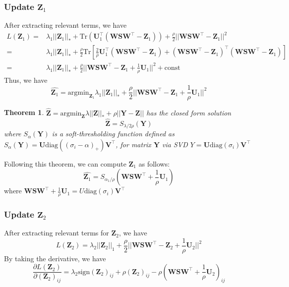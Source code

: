 \documentclass{article} %
\newtheorem{theorem}{Theorem}[section]
\begin{document}
\subsubsection{Update $\mathbf{Z}_1$}
After extracting relevant terms, we have
\begin{align}
L(\mathbf{Z}_1) =&  \lambda_1 ||\mathbf{Z}_1||_* + 
\text{Tr}(\mathbf{U}_1^{\top}(\mathbf{W}\mathbf{S}\mathbf{W}^\top-\mathbf{Z}_1)) + \frac{\rho}{2}||\mathbf{W}\mathbf{S}\mathbf{W}^\top-\mathbf{Z}_1||^2 \nonumber \\
=& \lambda_1 ||\mathbf{Z}_1||_* + \frac{\rho}{2}\text{Tr}\left[\frac{2}{\rho}\mathbf{U}_1^{\top}(\mathbf{W}\mathbf{S}\mathbf{W}^\top-\mathbf{Z}_1) + (\mathbf{W}\mathbf{S}\mathbf{W}^\top-\mathbf{Z}_1)^{\top}(\mathbf{W}\mathbf{S}\mathbf{W}^\top-\mathbf{Z}_1)\right] \nonumber\\
=& \lambda_1 ||\mathbf{Z}_1||_* +  \frac{\rho}{2}||\mathbf{W}\mathbf{S}\mathbf{W}^\top-\mathbf{Z}_1 + \frac{1}{\rho}\mathbf{U}_1||^2 + 
\text{const}
\end{align}
Thus, we have
\[
\hat{\mathbf{Z}_1} = \text{argmin}_{\mathbf{Z}_1} \lambda_1 ||\mathbf{Z}_1||_* +  \frac{\rho}{2}||\mathbf{W}\mathbf{S}\mathbf{W}^\top-\mathbf{Z}_1 + \frac{1}{\rho}\mathbf{U}_1||^2
\]

\begin{theorem}
$\hat{\mathbf{Z}}=\text{argmin}_{\mathbf{Z}} \lambda ||\mathbf{Z}||_* + \rho ||\mathbf{Y}-\mathbf{Z}||$ has the closed form solution
\[
\hat{\mathbf{Z}} = S_{\lambda/2\rho}(\mathbf{Y})
\]
where $S_{\alpha}(\mathbf{Y})$ is a soft-thresholding function defined as $S_{\alpha}(\mathbf{Y})=\mathbf{U}\text{diag}((\sigma_i-\alpha)_{+})\mathbf{V^{\top}}$, for matrix $\mathbf{Y}$ via SVD $Y=\mathbf{U}\text{diag}(\sigma_i)\mathbf{V}^{\top}$
\end{theorem}

Following this theorem, we can compute $\mathbf{Z}_1$ as follows:
\[
\hat{\mathbf{Z}_1}=S_{\alpha_1/\rho}(\mathbf{W}\mathbf{S}\mathbf{W}^\top + \frac{1}{\rho}\mathbf{U}_1)
\]
where $\mathbf{W}\mathbf{S}\mathbf{W}^\top+\frac{1}{\rho}\mathbf{U}_1 = U\text{diag}(\sigma_i)\mathbf{V}^{\top}$


\subsubsection{Update $\mathbf{Z}_2$}
After extracting relevant terms for $\mathbf{Z}_2$, we have
\[
L(\mathbf{Z}_2)=\lambda_2||\mathbf{Z}_2||_1 + \frac{\rho}{2}||\mathbf{W}\mathbf{S}\mathbf{W}^\top - \mathbf{Z}_2 + \frac{1}{\rho}\mathbf{U}_2||^2
\]
By taking the derivative, we have
\[
\frac{\partial L(\mathbf{Z}_2)}{\partial(\mathbf{Z}_2)_{ij}}=\lambda_2\text{sign}(\mathbf{Z}_2)_{ij} +\rho(\mathbf{Z}_2)_{ij}-\rho(\mathbf{W}\mathbf{S}\mathbf{W}^\top + \frac{1}{\rho}\mathbf{U}_2)_{ij}
\]
\end{document}
